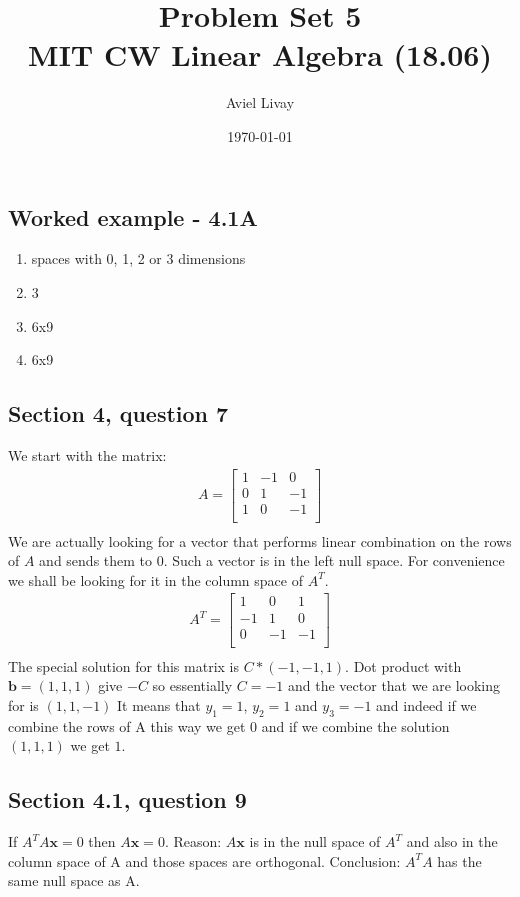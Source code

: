 \documentclass[a4paper,11pt]{article}
\title{%
	Problem Set 5\\
	\large MIT CW Linear Algebra (18.06)
}
\author{Aviel Livay}
\date{\today}
\newcommand{\mybf}[1]{\boldsymbol{#1}}
\begin{document}
\maketitle

\subsection*{Worked example - 4.1A}
\begin{enumerate}[label=\alph*]
\item spaces with 0, 1, 2 or 3 dimensions
\item 3
\item 6x9
\item 6x9
\end{enumerate}
\subsection*{Section 4, question 7}
We start with the matrix:
\begin{align*}
A = 
\begin{bmatrix}
1 & -1 & 0 \\
0 & 1 & -1\\
1 & 0 & -1\\
\end{bmatrix}\\
\end{align*}
We are actually looking for a vector that performs linear combination on the rows of $A$ and sends them to 0.
Such a vector is in the left null space.
For convenience we shall be looking for it in the column space of $A^T$.
\begin{align*}
A^T = 
\begin{bmatrix}
1 & 0 & 1 \\
-1 & 1 & 0\\
0 & -1 & -1\\
\end{bmatrix}\\
\end{align*}
The special solution for this matrix is $C*(-1,-1,1)$. Dot product with $\mybf{b}=(1,1,1)$ give $-C$ so essentially $C=-1$ and the vector that we are looking for is $(1,1,-1)$
It means that $y_1=1$, $y_2=1$ and $y_3=-1$ and indeed if we combine the rows of A this way we get $0$ and if we combine the solution $(1,1,1)$ we get $1$. 
\subsection*{Section 4.1, question 9}
If $A^TA\mybf{x} = 0$ then $A\mybf{x} = 0$. Reason: $A\mybf{x}$ is in the null space of $A^T$ and also in the
column space of A and those spaces are orthogonal. Conclusion: $A^TA$ has the same null space as A.
\end{document}
